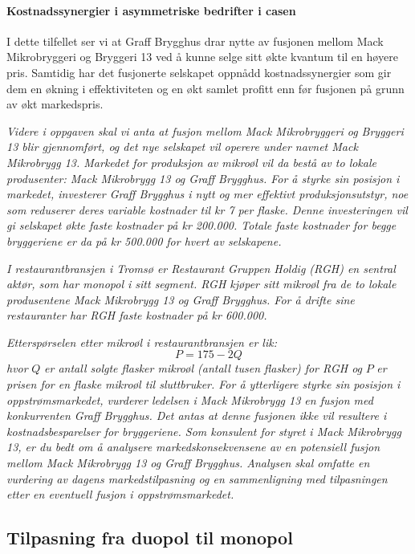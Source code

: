 \documentclass[
  12pt,
  a4paper,
  DIV=11,
  numbers=noendperiod]{scrartcl}
\let\oldparagraph\paragraph
\renewcommand{\paragraph}[1]{\oldparagraph{#1}\mbox{}}
\begin{document}
\paragraph{Kostnadssynergier i asymmetriske bedrifter i
casen}\label{kostnadssynergier-i-asymmetriske-bedrifter-i-casen}

I dette tilfellet ser vi at Graff Brygghus drar nytte av fusjonen mellom
Mack Mikrobryggeri og Bryggeri 13 ved å kunne selge sitt økte kvantum
til en høyere pris. Samtidig har det fusjonerte selskapet oppnådd
kostnadssynergier som gir dem en økning i effektiviteten og en økt
samlet profitt enn før fusjonen på grunn av økt markedspris.

\clearpage

\textit{Videre i oppgaven skal vi anta at fusjon mellom Mack Mikrobryggeri og Bryggeri 13 blir gjennomført, og det nye selskapet vil operere under navnet Mack Mikrobrygg 13. Markedet for produksjon av mikroøl vil da bestå av to lokale produsenter: Mack Mikrobrygg 13 og Graff Brygghus. For å styrke sin posisjon i markedet, investerer Graff Brygghus i nytt og mer effektivt produksjonsutstyr, noe som reduserer deres variable kostnader til kr 7 per flaske. Denne investeringen vil gi selskapet økte faste kostnader på kr 200.000. Totale faste kostnader for begge bryggeriene er da på kr 500.000 for hvert av selskapene.}

\textit{I restaurantbransjen i Tromsø er Restaurant Gruppen Holdig (RGH) en sentral aktør, som har monopol i sitt segment. RGH kjøper sitt mikroøl fra de to lokale produsentene Mack Mikrobrygg 13 og Graff Brygghus. For å drifte sine restauranter har RGH faste kostnader på kr 600.000.}

\textit{Etterspørselen etter mikroøl i restaurantbransjen er lik:} 
$$
P = 175 - 2Q
$$ 
\textit{hvor }$Q$\textit{ er antall solgte flasker mikroøl (antall tusen flasker) for RGH og }$P$\textit{ er prisen for en flaske mikroøl til sluttbruker. For å ytterligere styrke sin posisjon i oppstrømsmarkedet, vurderer ledelsen i Mack Mikrobrygg 13 en fusjon med konkurrenten Graff Brygghus. Det antas at denne fusjonen ikke vil resultere i kostnadsbesparelser for bryggeriene. Som konsulent for styret i Mack Mikrobrygg 13, er du bedt om å analysere markedskonsekvensene av en potensiell fusjon mellom Mack Mikrobrygg 13 og Graff Brygghus. Analysen skal omfatte en vurdering av dagens markedstilpasning og en sammenligning med tilpasningen etter en eventuell fusjon i oppstrømsmarkedet.}

\subsection{Tilpasning fra duopol til
monopol}\label{tilpasning-fra-duopol-til-monopol}
\end{document}
